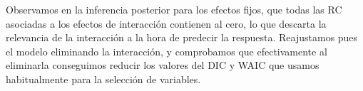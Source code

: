 \documentclass[
]{book}
\newenvironment{Shaded}{\begin{snugshade}}{\end{snugshade}}
\newcommand{\CommentTok}[1]{\textcolor[rgb]{0.56,0.35,0.01}{\textit{#1}}}
\newcommand{\NormalTok}[1]{#1}
\newcommand{\SpecialCharTok}[1]{\textcolor[rgb]{0.00,0.00,0.00}{#1}}
\begin{document}
\begin{Shaded}
\end{Shaded}

Observamos en la inferencia posterior para los efectos fijos, que todas las RC asociadas a los efectos de interacción contienen al cero, lo que descarta la relevancia de la interacción a la hora de predecir la respuesta. Reajustamos pues el modelo eliminando la interacción, y comprobamos que efectivamente al eliminarla conseguimos reducir los valores del DIC y WAIC que usamos habitualmente para la selección de variables.
\end{document}
